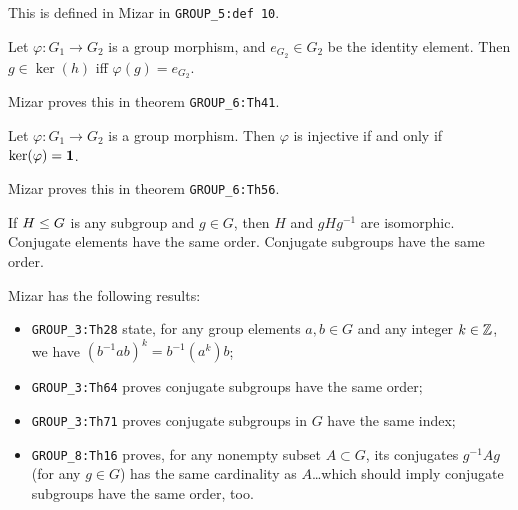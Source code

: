 \begin{remark}
This is defined in Mizar in
\verb#GROUP_5:def 10#.
\end{remark}

\begin{theorem}
  Let $\varphi\colon G_{1}\to G_{2}$ is a group morphism, and
  $e_{G_{2}}\in G_{2}$ be the identity element.
  Then $g\in\ker(h)$ iff $\varphi(g)=e_{G_{2}}$.
\end{theorem}

\begin{remark}
Mizar proves this in theorem \verb#GROUP_6:Th41#.
\end{remark}

\begin{theorem}
  Let $\varphi\colon G_{1}\to G_{2}$ is a group morphism.
  Then $\varphi$ is injective if and only if $\ker(\varphi)=\mathbf{1}$.
\end{theorem}

\begin{remark}
Mizar proves this in theorem \verb#GROUP_6:Th56#.
\end{remark}

\begin{theorem}
  If $H\leq G$ is any subgroup and $g\in G$, then
  $H$ and $gHg^{-1}$ are isomorphic. Conjugate elements have the same
  order. Conjugate subgroups have the same order.
\end{theorem}

\begin{remark}
Mizar has the following results:
\begin{itemize}
\item \verb#GROUP_3:Th28# state, for any group elements $a,b\in G$ and
  any integer $k\in\mathbb{Z}$, we have $(b^{-1}ab)^{k} = b^{-1}(a^{k})b$;
\item \verb#GROUP_3:Th64# proves conjugate subgroups have the same order;
\item \verb#GROUP_3:Th71# proves conjugate subgroups in $G$ have the
  same index;
\item \verb#GROUP_8:Th16# proves, for any nonempty subset $A\subset G$,
  its conjugates $g^{-1}Ag$ (for any $g\in G$) has the same cardinality
  as $A$\dots which should imply conjugate subgroups have the same
  order, too.
\end{itemize}
\end{remark}

